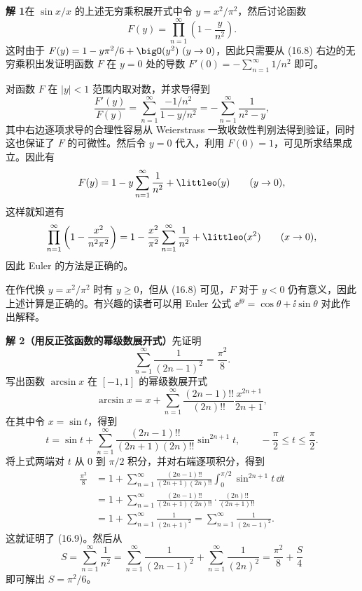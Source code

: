 \begin{xsolution}
\textbf{解 1}\quad 在 $\sin x/x$ 的上述无穷乘积展开式中令 $y=x^2/\pi^2$，然后讨论函数
\begin{equation}
  F(y)=\prod_{n=1}^{\infty}\left(1-\frac{y}{n^2}\right).
\tag{16.8}
\label{eq:16.8}
\end{equation}
这时由于 $F(y)=1-y\pi^2/6+\bigO(y^2)\ (y\to0)$，因此只需要从 (16.8) 右边的无穷乘积出发证明函数 $F$ 在 $y=0$ 处的导数 $F'(0)=-\sum_{n=1}^{\infty}1/n^2$ 即可。

对函数 $F$ 在 $|y|<1$ 范围内取对数，并求导得到
\[
  \frac{F'(y)}{F(y)}
  =\sum_{n=1}^{\infty}\frac{-1/n^2}{1-y/n^2}
  =-\sum_{n=1}^{\infty}\frac1{n^2-y},
\]
其中右边逐项求导的合理性容易从 Weierstrass 一致收敛性判别法得到验证，同时这也保证了 $F$ 的可微性。然后令 $y=0$ 代入，利用 $F(0)=1$，可见所求结果成立。因此有
\[
  F(y)=1-y\sum_{n=1}^{\infty}\frac1{n^2}+\littleo(y)\qquad(y\to0),
\]
这样就知道有
\[
  \prod_{n=1}^{\infty}\left(1-\frac{x^2}{n^2\pi^2}\right)
  =1-\frac{x^2}{\pi^2}\sum_{n=1}^{\infty}\frac1{n^2}+\littleo(x^2)\qquad(x\to0),
\]
因此 Euler 的方法是正确的。

\begin{xremark}
在作代换 $y=x^2/\pi^2$ 时有 $y\geqslant0$，但从 (16.8) 可见，$F$ 对于 $y<0$ 仍有意义，因此上述计算是正确的。有兴趣的读者可以用 Euler 公式 $\ee^{\ii\theta}=\cos\theta+\ii\sin\theta$ 对此作出解释。
\end{xremark}

\textbf{解 2（用反正弦函数的幂级数展开式）}\quad 先证明
\begin{equation}
  \sum_{n=1}^{\infty}\frac1{(2n-1)^2}=\frac{\pi^2}{8}.
\tag{16.9}
\label{eq:16.9}
\end{equation}
写出函数 $\arcsin x$ 在 $[-1,1]$ 的幂级数展开式
\[
  \arcsin x=x+\sum_{n=1}^{\infty}\frac{(2n-1)!!}{(2n)!!}\frac{x^{2n+1}}{2n+1},
\]
在其中令 $x=\sin t$，得到
\[
  t=\sin t+\sum_{n=1}^{\infty}
  \frac{(2n-1)!!}{(2n+1)(2n)!!}\sin^{2n+1}t,
  \qquad -\frac\pi2\leqslant t\leqslant\frac\pi2.
\]
将上式两端对 $t$ 从 0 到 $\pi/2$ 积分，并对右端逐项积分，得到
\[
\begin{aligned}
  \frac{\pi^2}{8}
  &=1+\sum_{n=1}^{\infty}\frac{(2n-1)!!}{(2n+1)(2n)!!}
      \int_0^{\pi/2}\sin^{2n+1}t\,\dd t\\
  &=1+\sum_{n=1}^{\infty}\frac{(2n-1)!!}{(2n+1)(2n)!!}
      \cdot\frac{(2n)!!}{(2n+1)!!}\\
  &=1+\sum_{n=1}^{\infty}\frac1{(2n+1)^2}
   =\sum_{n=1}^{\infty}\frac1{(2n-1)^2}.
\end{aligned}
\]
这就证明了 (16.9)。然后从
\[
  S=\sum_{n=1}^{\infty}\frac1{n^2}
   =\sum_{n=1}^{\infty}\frac1{(2n-1)^2}
    +\sum_{n=1}^{\infty}\frac1{(2n)^2}
   =\frac{\pi^2}{8}+\frac S4
\]
即可解出 $S=\pi^2/6$。
\end{xsolution}

